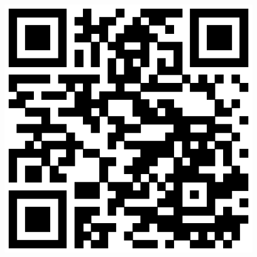 \documentclass[seriffont, cmap=Beijing, 10pt]{zz}
\begin{document}
\begin{frame}
\begin{minipage}{.48\textwidth}
\begin{block}{}
\begin{figure}
				\centering
				\includegraphics[width=.5\linewidth]{figs/qr-code-thesis}
			\end{figure}
		\end{block}
	\end{minipage}
\end{frame}
\end{document}
